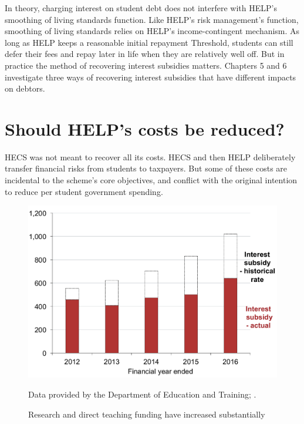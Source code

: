 \documentclass[embargoed]{grattan}
\begin{document}
In theory, charging interest on student debt does not interfere with \gls{HELP}'s smoothing of living standards function.
Like \gls{HELP}'s risk management's function, smoothing of living standards relies on \gls{HELP}'s income-contingent mechanism.
As long as \gls{HELP} keeps a reasonable initial repayment \gls{Threshold}, students can still defer their fees and repay later in life when they are relatively well off. \protect\hypertarget{_Ref435627338}{}{}But in practice the method of recovering interest subsidies matters.
Chapters 5 and 6 investigate three ways of recovering interest subsidies that have different impacts on debtors.

\section[Should {HELP}'s costs be reduced?]{Should \gls{HELP}'s costs be reduced?}\label{should-helps-costs-be-reduced}

\gls{HECS} was not meant to recover all its costs.
\gls{HECS} and then \gls{HELP} deliberately transfer financial risks from students to taxpayers.
But some of these costs are incidental to the scheme's core objectives, and conflict with the original intention to reduce per student government spending.

\begin{figure}
\caption{Research and direct teaching funding have increased substantially\label{fig:fig12-research-direct-teaching-funding-have-increased-substantially}}


\includegraphics[page=12]{atlas/Chartpack.pdf}

{Data provided by the Department of Education and Training; \textcites{Australia2014HigherEducationResearcha}{ABS2015ConsumerPriceIndex}.}
\end{figure}
\end{document}
